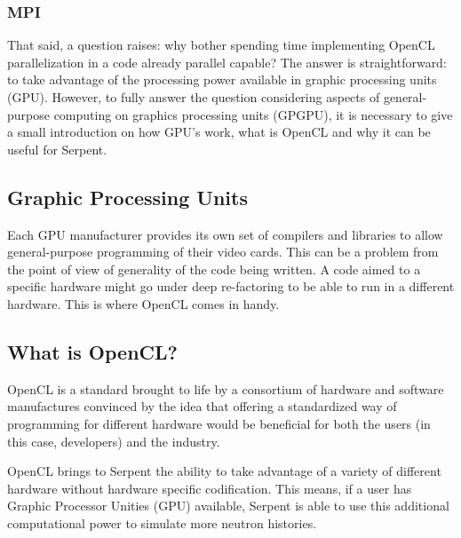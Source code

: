 \documentclass[twoside,a4paper,12pt,english]{anstrans}
\begin{document}
\subsubsection{MPI}

That said, a question raises: why bother spending time implementing OpenCL parallelization
in a code already parallel capable? The answer is straightforward: to take
advantage of the processing power available in graphic processing units (GPU).
However, to fully answer the question considering aspects of general-purpose computing on graphics
processing units (GPGPU), it is necessary to give a small introduction on how GPU's work, what is OpenCL and why
it can be useful for Serpent.


\subsection{Graphic Processing Units}

Each GPU manufacturer provides its own set of compilers and libraries to allow general-purpose
programming of their video cards. This can be a problem from the point of view of generality of
the code being written. A code aimed to a specific hardware might go under deep re-factoring to
be able to run in a different hardware. This is where OpenCL comes in handy.

\subsection{What is OpenCL?}

OpenCL\cite{Stone2010} is a standard brought to life by a consortium of hardware and software
manufactures convinced by the idea that offering a standardized way of programming for different
hardware would be beneficial for both the users (in this case, developers) and the industry.

OpenCL brings to Serpent the ability to take advantage of a variety of different hardware
without hardware specific codification. This means, if a user has Graphic Processor Unities (GPU)
available, Serpent is able to use this additional computational power to simulate
more neutron histories.
\end{document}
